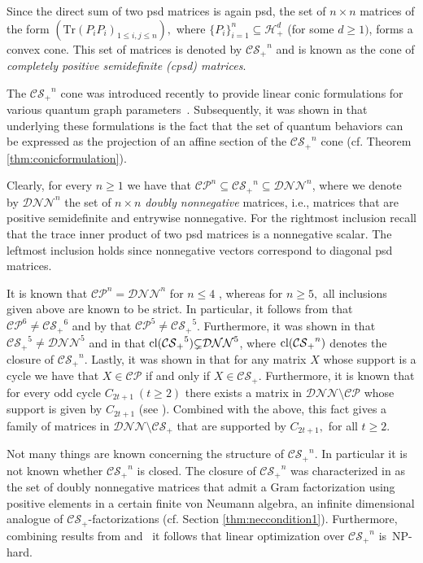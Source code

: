 \documentclass{siamart}
\begin{document}
Since the direct sum of two psd matrices is again psd,  the set of $n\times n$  matrices of the form $( {\mathrm{Tr}}(P_iP_i)_{1\le i,j\le n}), $
where  $\{P_i\}_{i=1}^n\subseteq {\mathcal{H}}^d_+$ (for some $d\ge 1)$,
forms a convex cone. This {set of matrices is} denoted by ${\mathcal{CS}_+}^n$ and is known  as
the cone of  {\em completely positive semidefinite {(cpsd)}
matrices}.

The ${\mathcal{CS}_+}^n$ cone was introduced recently to provide linear conic formulations for various quantum  graph parameters~\cite{LP14,R14b}.  Subsequently, it was shown  in \cite{SV} that underlying these formulations is the fact that the set of quantum behaviors   can be expressed as the projection of an affine section  of the ${\mathcal{CS}_+}^n$ cone (cf. Theorem \ref{thm:conicformulation}).

Clearly,  for  every $n\ge 1$ we have that
$  {\mathcal{CP}}^n \subseteq {\mathcal{CS}_+}^n \subseteq {\mathcal{DNN}}^n$, where we denote by ${\mathcal{DNN}}^n$ the set of $n\times n$ {\em doubly nonnegative} matrices, i.e., matrices that are  positive semidefinite and  entrywise nonnegative. For the rightmost inclusion recall that   the trace inner product of two psd matrices is a nonnegative scalar.  The leftmost inclusion holds since nonnegative vectors correspond to diagonal psd matrices.

It is known that   ${\mathcal{CP}}^n= {\mathcal{DNN}}^n$ for   $n\le 4$   \cite{MM61}, whereas  for $n\ge 5,$ all
inclusions  given above are known to be strict. In particular, it follows from \cite{FW} that ${\mathcal{CP}}^6\ne {\mathcal{CS}_+}^6$  and by \cite{FGPRT} that  ${\mathcal{CP}}^5\ne {\mathcal{CS}_+}^5$.  Furthermore,
it was  shown in  \cite{FW}  that ${\mathcal{CS}_+}^5\ne {\mathcal{DNN}}^5$ and in \cite{LP14}  that ${\rm cl}({\mathcal{CS}_+}^5) {\subsetneq}  {\mathcal{DNN}}^5$, where ${\rm cl}({\mathcal{CS}_+}^n)$ denotes the closure of ${\mathcal{CS}_+}^n$. Lastly, it was shown in \cite{LP14} that for any matrix $X$ whose support is {a cycle}  we have that $X\in {\mathcal{CP}}$ if and only if $X\in {\mathcal{CS}_+}$. Furthermore, it is known that for every odd cycle $C_{2t+1} \ (t\ge 2)$ there exists a  matrix in   ${\mathcal{DNN}}\setminus {\mathcal{CP}}$ whose support is given by $C_{2t+1}$ (see \cite[Theorem~2.12]{CP}).  Combined with the above, this fact gives a family of matrices in ${\mathcal{DNN}}\setminus {\mathcal{CS}_+}$  that are supported by $C_{2t+1},$ for all $t\ge 2$.

Not many things are  known  concerning  the  structure of   {${\mathcal{CS}_+}^n$}. In
particular it is not known whether {${\mathcal{CS}_+}^n$} is closed. The
closure of ${\mathcal{CS}_+}^n$  was  characterized  in  \cite{BLP} as
the set of doubly nonnegative matrices that admit a Gram
factorization using positive elements in a certain finite  von
Neumann algebra,  an infinite dimensional analogue of ${\mathcal{CS}_+}$-factorizations (cf. Section \ref{thm:neccondition1}). Furthermore,
combining results from \cite{LP14} and~\cite{Ji13}   it follows that linear
optimization over {${\mathcal{CS}_+}^n$} is~NP-hard.
\end{document}
